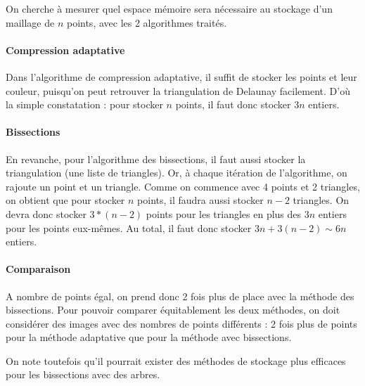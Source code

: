\documentclass{report}
\begin{document}
On cherche à mesurer quel espace mémoire sera nécessaire au stockage d'un maillage de $n$ points, avec les 2 algorithmes traités.

\paragraph{Compression adaptative}

Dans l'algorithme de compression adaptative, il suffit de stocker les points et leur couleur, puisqu'on peut retrouver la triangulation de Delaunay facilement. D'où la simple constatation : pour stocker $n$ points, il faut donc stocker $3n$ entiers.

\paragraph{Bissections}

En revanche, pour l'algorithme des bissections, il faut aussi stocker la triangulation (une liste de triangles). Or, à chaque itération de l'algorithme, on rajoute un point et un triangle. Comme on commence avec 4 points et 2 triangles, on obtient que pour stocker $n$ points, il faudra aussi stocker $n-2$ triangles. On devra donc stocker $3*(n-2)$ points pour les triangles en plus des $3n$ entiers pour les points eux-mêmes. Au total, il faut donc stocker $3n + 3(n-2) \sim 6n$ entiers.

\paragraph{Comparaison}

A nombre de points égal, on prend donc 2 fois plus de place avec la méthode des bissections. Pour pouvoir comparer équitablement les deux méthodes, on doit considérer des images avec des nombres de points différents : 2 fois plus de points pour la méthode adaptative que pour la méthode avec bissections.

On note toutefois qu'il pourrait exister des méthodes de stockage plus efficaces pour les bissections avec des arbres.
\end{document}
